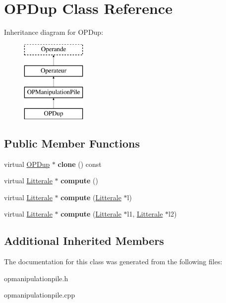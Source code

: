 \hypertarget{class_o_p_dup}{}\section{O\+P\+Dup Class Reference}
\label{class_o_p_dup}
Inheritance diagram for O\+P\+Dup\+:\begin{figure}[H]
\begin{center}
\leavevmode
\includegraphics[height=4.000000cm]{class_o_p_dup}
\end{center}
\end{figure}
\subsection*{Public Member Functions}
\begin{DoxyCompactItemize}
\item 
virtual \hyperlink{class_o_p_dup}{O\+P\+Dup} $\ast$ {\bfseries clone} () const \hypertarget{class_o_p_dup_a193c5d1707956c45d83dd1f90338a412}{}\label{class_o_p_dup_a193c5d1707956c45d83dd1f90338a412}

\item 
virtual \hyperlink{class_litterale}{Litterale} $\ast$ {\bfseries compute} ()\hypertarget{class_o_p_dup_a155c182db91aed7d472cfb624fa01a99}{}\label{class_o_p_dup_a155c182db91aed7d472cfb624fa01a99}

\item 
virtual \hyperlink{class_litterale}{Litterale} $\ast$ {\bfseries compute} (\hyperlink{class_litterale}{Litterale} $\ast$l)\hypertarget{class_o_p_dup_a555ea493eee87bb8b9b4d2c66c9210b8}{}\label{class_o_p_dup_a555ea493eee87bb8b9b4d2c66c9210b8}

\item 
virtual \hyperlink{class_litterale}{Litterale} $\ast$ {\bfseries compute} (\hyperlink{class_litterale}{Litterale} $\ast$l1, \hyperlink{class_litterale}{Litterale} $\ast$l2)\hypertarget{class_o_p_dup_af761a9cb8f7d5c8e16681b46f9e03192}{}\label{class_o_p_dup_af761a9cb8f7d5c8e16681b46f9e03192}

\end{DoxyCompactItemize}
\subsection*{Additional Inherited Members}


The documentation for this class was generated from the following files\+:\begin{DoxyCompactItemize}
\item 
opmanipulationpile.\+h\item 
opmanipulationpile.\+cpp\end{DoxyCompactItemize}
